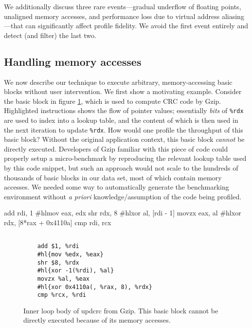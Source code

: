 We additionally discuss three rare events---gradual underflow of floating points, unaligned memory accesses,
and performance loss due to virtual address aliasing---that
can significantly affect profile fidelity.
We avoid the first event entirely and detect (and filter) the last two.

\subsection{Handling memory accesses}\label{sec:mapping}
We now describe our technique to execute arbitrary, memory-accessing basic blocks
without user intervention.
We first show a motivating example.
Consider the basic block in figure \ref{fig:mem-ex},
which is used to compute CRC code by Gzip.
Highlighted instructions shows the flow of pointer values;
essentially \textit{bits} of \verb|%rdx| are used to index into a lookup table, 
and the content of which is then used in the next iteration to 
update \verb|%rdx|.
How would one profile the throughput of this basic block?
Without the original application context,
this basic block \textit{cannot} be directly executed.
Developers of Gzip familiar with this piece of code could 
properly setup a micro-benchmark by reproducing the
relevant lookup table used by this code snippet,
but such an approach would not scale to the hundreds of 
thousands of basic blocks in our data set, most of which contain memory accesses.
We needed some way to automatically generate the benchmarking environment
without \textit{a priori} knowledge/assumption of the code being profiled.

    add rdi, 1
    #hl{mov eax, edx}
    shr rdx, 8
    #hl{xor al, [rdi - 1]}
    movzx eax, al
    #hl{xor rdx, [8*rax + 0x4110a]}
    cmp rdi, rcx
\fi
\begin{figure}[h]
\begin{Verbatim}[commandchars=\#\{\}]
    
    add $1, %rdi
    #hl{mov %edx, %eax}
    shr $8, %rdx
    #hl{xor -1(%rdi), %al}
    movzx %al, %eax
    #hl{xor 0x4110a(, %rax, 8), %rdx}
    cmp %rcx, %rdi
\end{Verbatim}
\caption{Inner loop body of updcrc from Gzip.
This basic block cannot be directly executed because
of its memory accesses.}
\label{fig:mem-ex}
\end{figure}

